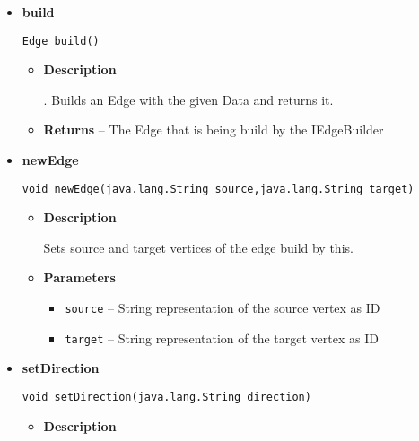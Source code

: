 {{{{{{{{\begin{itemize}
{\begin{itemize}
{Adds additional data to this edge. The specific EdgeBuilder implementation needs to decide how to save the value for given edge type.
}
\item{
{\bf  Parameters}
  \begin{itemize}
   \item{
\texttt{keyname} -- Name of the attribute}
   \item{
\texttt{value} -- Value of the attribute}
  \end{itemize}
}%
\end{itemize}
}%
\item{ 
{\bf  build}\\
\begin{lstlisting}[frame=none]
Edge build()\end{lstlisting} %
\begin{itemize}
\item{
{\bf  Description}

. Builds an Edge with the given Data and returns it.
}
\item{{\bf  Returns} -- 
The Edge that is being build by the IEdgeBuilder 
}%
\end{itemize}
}%
\item{ 
{\bf  newEdge}\\
\begin{lstlisting}[frame=none]
void newEdge(java.lang.String source,java.lang.String target)\end{lstlisting} %
\begin{itemize}
\item{
{\bf  Description}

Sets source and target vertices of the edge build by this.
}
\item{
{\bf  Parameters}
  \begin{itemize}
   \item{
\texttt{source} -- String representation of the source vertex as ID}
   \item{
\texttt{target} -- String representation of the target vertex as ID}
  \end{itemize}
}%
\end{itemize}
}%
\item{ 
{\bf  setDirection}\\
\begin{lstlisting}[frame=none]
void setDirection(java.lang.String direction)\end{lstlisting} %
\begin{itemize}
\item{
{\bf  Description}

}
\end{itemize}}
\end{itemize}}}}}}}}}
